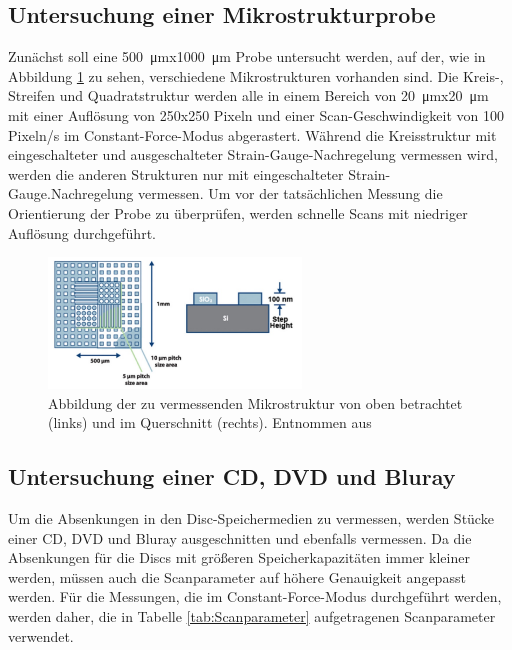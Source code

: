   \newpage
  \subsection{Untersuchung einer Mikrostrukturprobe}
    Zunächst soll eine \SI{500}{\micro\metre}x\SI{1000}{\micro\metre} Probe untersucht werden, auf der, wie in Abbildung \ref{fig:Mikrostruktur} zu sehen, verschiedene Mikrostrukturen vorhanden sind.
    Die Kreis-, Streifen und Quadratstruktur werden alle in einem Bereich von \SI{20}{\micro\metre}x\SI{20}{\micro\metre} mit einer Auflösung von 250x250 Pixeln und einer Scan-Geschwindigkeit von 
    100 Pixeln/s im Constant-Force-Modus abgerastert. Während die Kreisstruktur mit eingeschalteter und ausgeschalteter Strain-Gauge-Nachregelung vermessen wird, werden die anderen Strukturen nur mit eingeschalteter 
    Strain-Gauge.Nachregelung vermessen. Um vor der tatsächlichen Messung die Orientierung der Probe zu überprüfen, werden schnelle Scans mit niedriger Auflösung durchgeführt.

    \begin{figure}[h]
      \centering
      \includegraphics[width = 0.6\textwidth]{pictures/Mikrostruktur.png}
      \caption{Abbildung der zu vermessenden Mikrostruktur von oben betrachtet (links) und im Querschnitt (rechts). Entnommen aus \cite{tu_dortmund_versuchsanleitung_nodate}}
      \label{fig:Mikrostruktur}
    \end{figure}
    \FloatBarrier
  \subsection{Untersuchung einer CD, DVD und Bluray}
    Um die Absenkungen in den Disc-Speichermedien zu vermessen, werden Stücke einer CD, DVD und Bluray ausgeschnitten und ebenfalls vermessen. Da die Absenkungen für die Discs mit größeren Speicherkapazitäten
    immer kleiner werden, müssen auch die Scanparameter auf höhere Genauigkeit angepasst werden. Für die Messungen, die im Constant-Force-Modus durchgeführt werden, werden daher, die in Tabelle 
    \ref{tab:Scanparameter} aufgetragenen Scanparameter verwendet.

